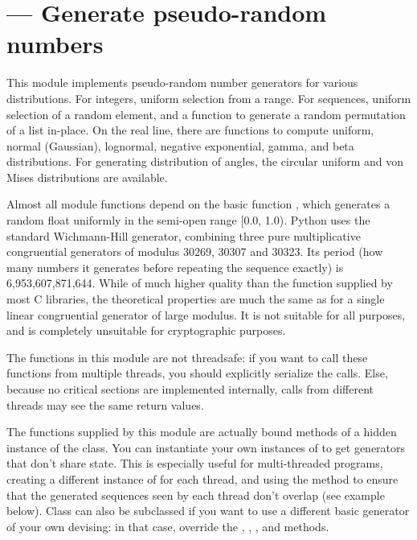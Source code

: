 \section{ ---
         Generate pseudo-random numbers}



This module implements pseudo-random number generators for various
distributions.
For integers, uniform selection from a range.
For sequences, uniform selection of a random element, and a function to
generate a random permutation of a list in-place.
On the real line, there are functions to compute uniform, normal (Gaussian),
lognormal, negative exponential, gamma, and beta distributions.
For generating distribution of angles, the circular uniform and
von Mises distributions are available.

Almost all module functions depend on the basic function
, which generates a random float uniformly in
the semi-open range [0.0, 1.0).  Python uses the standard Wichmann-Hill
generator, combining three pure multiplicative congruential
generators of modulus 30269, 30307 and 30323.  Its period (how many
numbers it generates before repeating the sequence exactly) is
6,953,607,871,644.  While of much higher quality than the 
function supplied by most C libraries, the theoretical properties
are much the same as for a single linear congruential generator of
large modulus.  It is not suitable for all purposes, and is completely
unsuitable for cryptographic purposes.

The functions in this module are not threadsafe:  if you want to call these
functions from multiple threads, you should explicitly serialize the calls.
Else, because no critical sections are implemented internally, calls
from different threads may see the same return values.

The functions supplied by this module are actually bound methods of a
hidden instance of the  class.  You can instantiate your
own instances of  to get generators that don't share state.
This is especially useful for multi-threaded programs, creating a different
instance of  for each thread, and using the 
method to ensure that the generated sequences seen by each thread don't
overlap (see example below).
Class  can also be subclassed if you want to use a different
basic generator of your own devising:  in that case, override the
, , ,
 and  methods.

